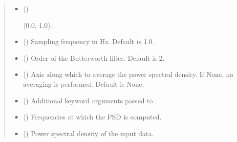 \documentclass[letterpaper,10pt,english]{sphinxmanual}
\begin{document}
\begin{fulllineitems}
\begin{quote}
\begin{description}
\begin{itemize}
\begin{description}
\end{description}


\item {} 
\sphinxAtStartPar
{} (\sphinxstyleliteralemphasis{\sphinxupquote{, }}) \textendash{} \begin{description}
\sphinxAtStartPar
(0.0, 1.0).

\end{description}


\item {} 
\sphinxAtStartPar
{} (\sphinxstyleliteralemphasis{\sphinxupquote{, }}) \textendash{} Sampling frequency in Hz. Default is 1.0.

\item {} 
\sphinxAtStartPar
{} (\sphinxstyleliteralemphasis{\sphinxupquote{, }}) \textendash{} Order of the Butterworth filter. Default is 2.

\item {} 
\sphinxAtStartPar
{} (\sphinxstyleliteralemphasis{\sphinxupquote{, }}) \textendash{} Axis along which to average the power spectral density. If None, no
averaging is performed. Default is None.

\item {} 
\sphinxAtStartPar
{} (\sphinxstyleliteralemphasis{\sphinxupquote{, }}) \textendash{} Additional keyword arguments passed to .

\end{itemize}

\sphinxAtStartPar
\begin{itemize}
\item {} 
\sphinxAtStartPar
{} () \textendash{} Frequencies at which the PSD is computed.

\item {} 
\sphinxAtStartPar
{} () \textendash{} Power spectral density of the input data.

\end{itemize}


\end{description}\end{quote}

\end{fulllineitems}
\end{document}

